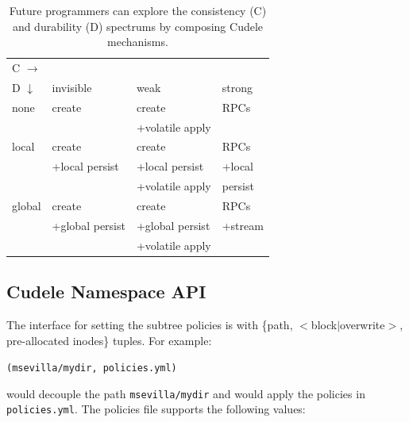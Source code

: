 \begin{table}[t]
\begin{center}
\caption{Future programmers can explore the consistency (C) and
durability (D) spectrums by composing Cudele mechanisms. 
\label{table:spectrum}}
\begin{tabular}{ l | l | l | l }
  C \(\rightarrow\) &&& \\  
  D \(\downarrow\)  	     & invisible         & weak        & strong  \\\hline
  none                       & create            & create          & RPCs    \\
                             &                   & +volatile apply &         \\\hdashline
  local                      & create            & create          & RPCs    \\
                             & +local persist    & +local persist  & +local  \\
                             &                   & +volatile apply &  persist\\\hdashline
  global                     & create            & create          & RPCs    \\
                             & +global persist   & +global persist & +stream \\
                             &                   & +volatile apply &         \\
\end{tabular}
\end{center}
\end{table}

\subsection{Cudele Namespace API}
\label{sec:cudele-namespace-api}

The interface for setting the subtree policies is with \{path,
\(<\)block\(|\)overwrite\(>\), pre-allocated inodes\} tuples. For example:

\texttt{(msevilla/mydir, policies.yml)}

would decouple the path \texttt{msevilla/mydir} and would apply the policies in
\texttt{policies.yml}. The policies file supports the following values:

